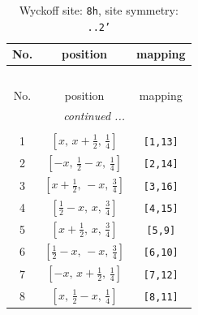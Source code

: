 \documentclass[fleqn,8pt]{jsarticle}
\begin{document}
\begin{longtable}{ccc}
\caption{Wyckoff site: {\tt 8h}, site symmetry: {\tt ..2'}}
 \\
 \hline \hline
No. & position & mapping \\ \hline \endfirsthead

\multicolumn{2}{l}{\tablename\ \thetable{}} \\
 \hline \hline
No. & position & mapping \\ \hline \endhead

 \hline \hline
\multicolumn{2}{r}{\footnotesize\it continued ...} \\ \endfoot

 \hline \hline
\multicolumn{2}{r}{} \\ \endlastfoot

1 & $\left[ x,\, x + \frac{1}{2},\, \frac{1}{4} \right]$ & {\tt [1,13]} \\ \hline
2 & $\left[ - x,\, \frac{1}{2} - x,\, \frac{1}{4} \right]$ & {\tt [2,14]} \\ \hline
3 & $\left[ x + \frac{1}{2},\, - x,\, \frac{3}{4} \right]$ & {\tt [3,16]} \\ \hline
4 & $\left[ \frac{1}{2} - x,\, x,\, \frac{3}{4} \right]$ & {\tt [4,15]} \\ \hline
5 & $\left[ x + \frac{1}{2},\, x,\, \frac{3}{4} \right]$ & {\tt [5,9]} \\ \hline
6 & $\left[ \frac{1}{2} - x,\, - x,\, \frac{3}{4} \right]$ & {\tt [6,10]} \\ \hline
7 & $\left[ - x,\, x + \frac{1}{2},\, \frac{1}{4} \right]$ & {\tt [7,12]} \\ \hline
8 & $\left[ x,\, \frac{1}{2} - x,\, \frac{1}{4} \right]$ & {\tt [8,11]} \\
\end{longtable}
\renewcommand{\arraystretch}{1.2}
\end{document}
